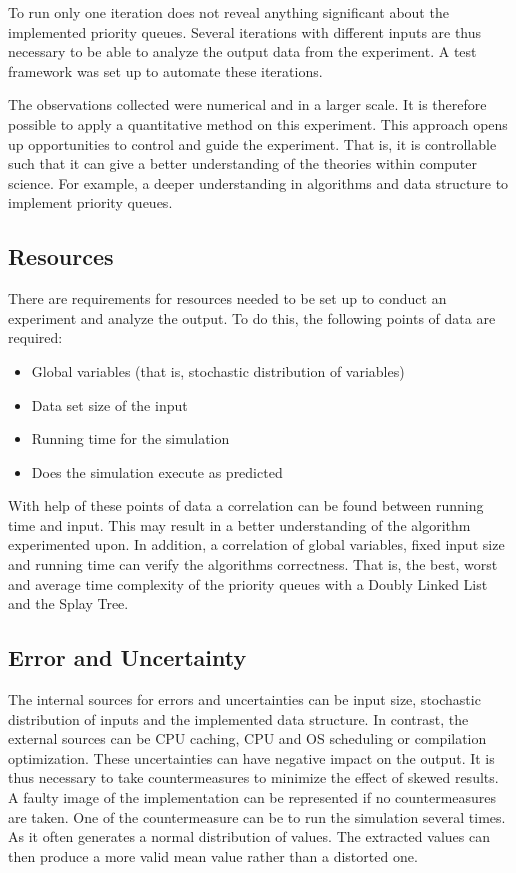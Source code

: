 \documentclass[a4paper,11pt]{kth-mag}
\begin{document}
To run only one iteration does not reveal anything significant about the implemented priority queues.
Several iterations with different inputs are thus necessary to be able to analyze the output data from the experiment.
A test framework was set up to automate these iterations.

The observations collected were numerical and in a larger scale.
It is therefore possible to apply a quantitative method on this experiment.
This approach opens up opportunities to control and guide the experiment.
That is, it is controllable such that it can give a better understanding of the theories within computer science.
For example, a deeper understanding in algorithms and data structure to implement priority queues.

\subsection{Resources}
There are requirements for resources needed to be set up to conduct an experiment and analyze the output.
To do this, the following points of data are required:
\begin{itemize}
    \item Global variables (that is, stochastic distribution of variables)
    \item Data set size of the input
    \item Running time for the simulation
    \item Does the simulation execute as predicted
\end{itemize}

With help of these points of data a correlation can be found between running time and input.
This may result in a better understanding of the algorithm experimented upon.
In addition, a correlation of global variables, fixed input size and running time can verify the algorithms correctness.
That is, the best, worst and average time complexity of the priority queues with a Doubly Linked List and the Splay Tree.

\subsection{Error and Uncertainty}
The internal sources for errors and uncertainties can be input size, stochastic distribution of inputs and the implemented data structure.
In contrast, the external sources can be CPU caching, CPU and OS scheduling or compilation optimization.
These uncertainties can have negative impact on the output.
It is thus necessary to take countermeasures to minimize the effect of skewed results.
A faulty image of the implementation can be represented if no countermeasures are taken.
One of the countermeasure can be to run the simulation several times.
As it often generates a normal distribution of values.
The extracted values can then produce a more valid mean value rather than a distorted one.
\end{document}
